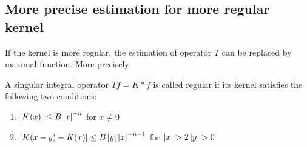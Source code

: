 \subsection{More precise estimation for more regular kernel}
If the kernel is more regular, the estimation of operator $T$ can be replaced by maximal function. More precisely:
\begin{definition}
    A singular integral operator $Tf=K*f$ is called regular if its kernel satisfies the following two conditions:
    \begin{enumerate}
        \item $\left\lvert K(x)\right\rvert\leq B\left\lvert x\right\rvert^{-n}$ for $x\neq 0$
        \item $\left\lvert K(x-y)-K(x)\right\rvert\leq B\left\lvert y\right\rvert\left\lvert x\right\rvert^{-n-1}$ for $\left\lvert x\right\rvert>2\left\lvert y\right\rvert>0$
    \end{enumerate}
\end{definition}

